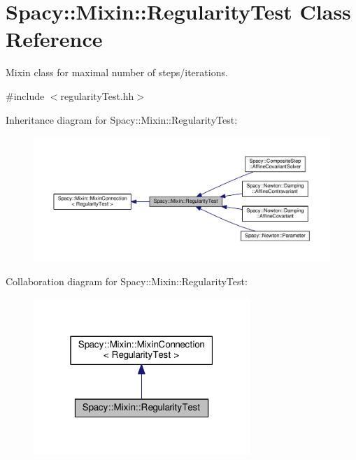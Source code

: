 \hypertarget{classSpacy_1_1Mixin_1_1RegularityTest}{\section{Spacy\-:\-:Mixin\-:\-:Regularity\-Test Class Reference}
\label{classSpacy_1_1Mixin_1_1RegularityTest}
}


Mixin class for maximal number of steps/iterations.  




{\ttfamily \#include $<$regularity\-Test.\-hh$>$}



Inheritance diagram for Spacy\-:\-:Mixin\-:\-:Regularity\-Test\-:
\nopagebreak
\begin{figure}[H]
\begin{center}
\leavevmode
\includegraphics[width=350pt]{classSpacy_1_1Mixin_1_1RegularityTest__inherit__graph}
\end{center}
\end{figure}


Collaboration diagram for Spacy\-:\-:Mixin\-:\-:Regularity\-Test\-:
\nopagebreak
\begin{figure}[H]
\begin{center}
\leavevmode
\includegraphics[width=232pt]{classSpacy_1_1Mixin_1_1RegularityTest__coll__graph}
\end{center}
\end{figure}
